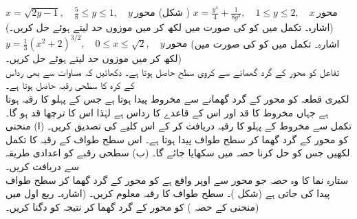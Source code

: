 $x=\sqrt{2y-1},\quad \tfrac{5}{8}\le y\le 1,\quad y\,\text{محور}$
\quad
(شکل )
$x=\tfrac{y^4}{4}+\tfrac{1}{8y^2},\quad 1\le y\le 2,\quad x\,\text{محور}$
\quad
(اشارہ۔ تکمل میں  کو  کی صورت میں لکھ کر  میں موزوں حد لیتے ہوئے حل کریں۔)
$y=\tfrac{1}{3}(x^2+2)^{3/2},\quad 0\le x\le \sqrt{2},\quad y\,\text{محور}$
\quad
(اشارہ۔ تکمل میں  کو  کی صورت میں لکھ کر  میں موزوں حد لیتے ہوئے حل کریں۔)
\\
تفاعل  کو محور  کے گرد گھمانے سے کروی سطح حاصل ہوتا ہے۔ دکھائیں کہ مساوات  سے بھی رداس   کے کرہ کا سطحی رقبہ  حاصل ہوتا ہے۔
\\
لکیری قطعہ  کو محور  کے گرد گھمانے سے مخروط پیدا ہوتا ہے جس کے پہلو کا رقبہ  ہوتا ہے جہاں مخروط کا قد  اور اس کے قاعدے   کا رداس  ہے لہٰذا اس کا ترچھا قد  ہو گا۔ تکمل سے مخروط کے پہلو کا رقبہ دریافت کر کے اس کلیے  کی تصدیق کریں۔ 
   (ا) منحنی  کو محور  کے گرد گھما کر سطح طواف پیدا ہوتا ہے۔ اس سطح طواف کے رقبہ کا تکمل لکھیں جس کو حل کرنا حصہ  میں سکھایا جائے گا۔ (ب)  سطحی رقبے کو اعدادی طریقہ سے دریافت کریں۔
\\
ستارہ نما  کا وہ حصہ جو محور  سے اوپر واقع ہے کو محور  کے گرد گھما کر سطح طواف پیدا کی جاتی ہے (شکل )۔  سطح طواف کا رقبہ معلوم کریں۔ (اشارہ۔ ربع اول میں منحنی کے حصہ ) کو محور  کے گرد گھما کر نتیجہ  کو دگنا کریں۔)
